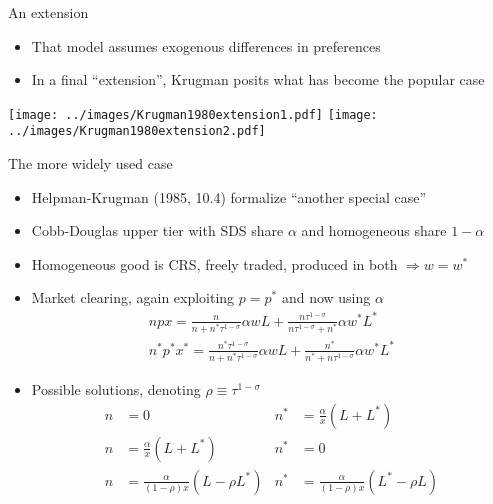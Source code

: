 \documentclass[10pt,notes=hide]{beamer}
\begin{document}
\begin{frame}{An extension}
\begin{itemize}
	\item That model assumes exogenous differences in preferences
	\item In a final ``extension'', Krugman posits what has become the popular case
\end{itemize}
\texttt{[image: ../images/Krugman1980extension1.pdf]} \hfill
\texttt{[image: ../images/Krugman1980extension2.pdf]}
\end{frame}
\begin{frame}{The more widely used case}
\begin{itemize}
	\item Helpman-Krugman (1985, 10.4) formalize ``another special case''
	\item Cobb-Douglas upper tier with SDS share $\alpha$ and homogeneous share $1-\alpha$
	\item Homogeneous good is CRS, freely traded, produced in both $\Rightarrow w = w^*$
	\pause
	\item Market clearing, again exploiting $p=p^*$ and now using $\alpha$ 
	\begin{align*}
	npx = \frac{n}{n + n^*\tau^{1-\sigma}} \alpha w L + \frac{n\tau^{1-\sigma}}{n\tau^{1-\sigma} + n^*} \alpha w^* L^* \\
	n^*p^*x^* = \frac{n^*\tau^{1-\sigma}}{n + n^*\tau^{1-\sigma}} \alpha w L + \frac{n^*}{n^* + n\tau^{1-\sigma}} \alpha w^* L^*
	\end{align*}
		\item Possible solutions, denoting $\rho\equiv\tau^{1-\sigma}$
	\begin{align*}
	n&=0 & n^* &= \frac{\alpha}{x} \left(L + L^* \right)\\
	n&=\frac{\alpha}{x} \left(L + L^* \right) & n^* &= 0 \\
	n&=\frac{\alpha}{(1-\rho)x} \left(L-\rho L^*\right) & n^* &= \frac{\alpha}{(1-\rho)x} \left(L^*-\rho L\right)
	\end{align*}
\end{itemize}
\end{frame}
\end{document}
